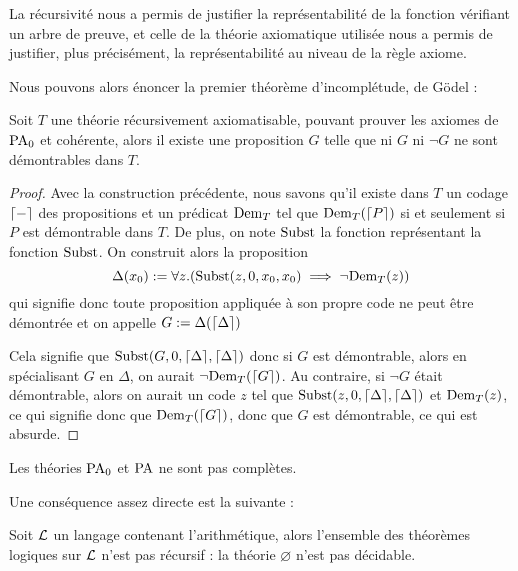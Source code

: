 \begin{rmk}
    La récursivité nous a permis de justifier la représentabilité de la fonction vérifiant un arbre de preuve, et celle de la théorie axiomatique utilisée nous a permis de justifier, plus précisément, la représentabilité au niveau de la règle axiome.
\end{rmk}

Nous pouvons alors énoncer la premier théorème d'incomplétude, de Gödel :

\begin{them}
    Soit $T$ une théorie récursivement axiomatisable, pouvant prouver les axiomes de $\mathrm{PA}_0$ et cohérente, alors il existe une proposition $G$ telle que ni $G$ ni $\lnot G$ ne sont démontrables dans $T$.
\end{them}

\begin{proof}
    Avec la construction précédente, nous savons qu'il existe dans $T$ un codage $\lceil - \rceil$ des propositions et un prédicat $\mathrm{Dem}_T$ tel que $\mathrm{Dem}_T(\lceil P \rceil)$ si et seulement si $P$ est démontrable dans $T$. De plus, on note $\mathrm{Subst}$ la fonction représentant la fonction $\mathrm{Subst}$. On construit alors la proposition $$\Delta(x_0) := \forall z.(\mathrm{Subst}(z,0,x_0,x_0) \implies \lnot\mathrm{Dem}_T(z))$$ qui signifie donc \og toute proposition appliquée à son propre code ne peut être démontrée\fg{} et on appelle $G := \Delta(\lceil \Delta \rceil)$

    Cela signifie que $\mathrm{Subst}(G,0,\lceil \Delta \rceil,\lceil \Delta \rceil)$ donc si $G$ est démontrable, alors en spécialisant $G$ en $\Delta$, on aurait $\lnot\mathrm{Dem}_T(\lceil G \rceil)$. Au contraire, si $\lnot G$ était démontrable, alors on aurait un code $z$ tel que $\mathrm{Subst}(z,0,\lceil \Delta \rceil,\lceil \Delta \rceil)$ et $\mathrm{Dem}_T(z)$, ce qui signifie donc que $\mathrm{Dem}_T(\lceil G \rceil)$, donc que $G$ est démontrable, ce qui est absurde.
\end{proof}

\begin{cor}
    Les théories $\mathrm{PA}_0$ et $\mathrm{PA}$ ne sont pas complètes.
\end{cor}

Une conséquence assez directe est la suivante : 

\begin{them}[Church]
    Soit $\mathcal L$ un langage contenant l'arithmétique, alors l'ensemble des théorèmes logiques sur $\mathcal L$ n'est pas récursif : la théorie $\varnothing$ n'est pas décidable.
\end{them}

